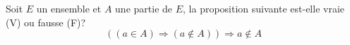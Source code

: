Soit $E$ un ensemble et $A$ une partie de $E$, la proposition suivante est-elle vraie (V) ou fausse (F)?
\begin{displaymath}
  \left( ( a \in A) \Rightarrow (a \notin A) \right) \Rightarrow a \notin A 
\end{displaymath}
